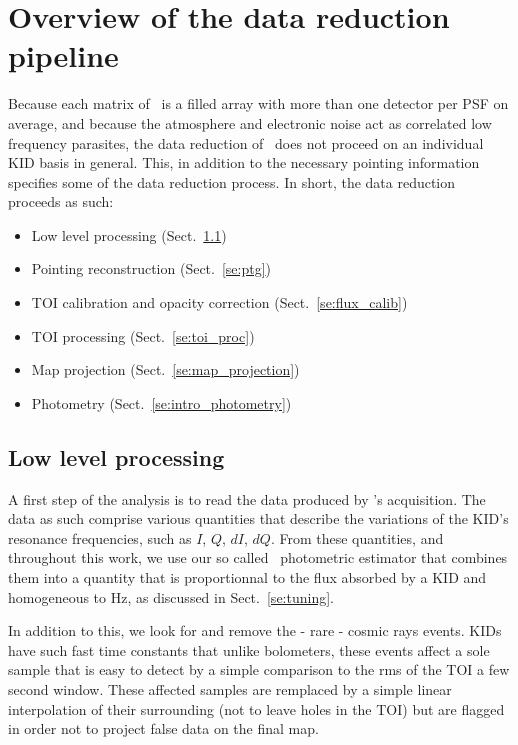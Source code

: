

\section{Overview of the data reduction pipeline}%
\label{se:pipeline_overview}

Because each matrix of \nika\ is a filled array with more than one
detector per  PSF on average, and because the atmosphere and electronic noise act as
correlated low frequency parasites, the data reduction of \nika\ does not
proceed on an individual KID basis in general. This, in addition to the
necessary pointing information specifies some of the data reduction
process. In short, the data reduction proceeds as such:

\begin{itemize}
\item Low level processing (Sect.~\ref{se:ll_proc})
\item Pointing reconstruction (Sect.~\ref{se:ptg})
\item TOI calibration and opacity correction (Sect.~\ref{se:flux_calib})
\item TOI processing (Sect.~\ref{se:toi_proc})
\item Map projection (Sect.~\ref{se:map_projection})
\item Photometry (Sect.~\ref{se:intro_photometry})
\end{itemize}

\subsection{Low level processing}
\label{se:ll_proc}

A first step of the analysis is to read the data produced by \nika's
acquisition. The data as such comprise various quantities that describe the
variations of the KID's resonance frequencies, such as $I$, $Q$, $dI$,
$dQ$. From these quantities, and throughout this work, we use our so called
\rf\ photometric estimator that combines them into a quantity that is
proportionnal to the flux absorbed by a KID \cite{Calvo13} and
homogeneous to Hz, as discussed in Sect.~\ref{se:tuning}.

In addition to this, we look for and remove the - rare - cosmic rays
events. KIDs have such fast time constants that unlike bolometers, these events
affect a sole sample that is easy to detect by a simple comparison to the rms of
the TOI a few second window. These affected samples are remplaced by a simple
linear interpolation of their surrounding (not to leave holes in the TOI) but
are flagged in order not to project false data on the final map.

